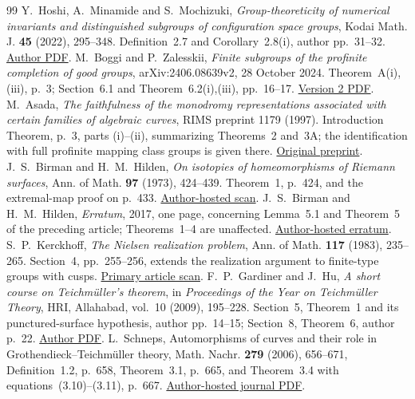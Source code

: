 \documentclass[11pt,a4paper]{article}
\theoremstyle{definition}
\theoremstyle{remark}
\begin{document}
\begin{thebibliography}{99}
 Y.~Hoshi, A.~Minamide and S.~Mochizuki,
\emph{Group-theoreticity of numerical invariants and distinguished
subgroups of configuration space groups}, Kodai Math. J.
\textbf{45} (2022), 295--348. Definition~2.7 and
Corollary~2.8(i), author pp.~31--32.
\href{https://www.kurims.kyoto-u.ac.jp/~motizuki/Numerical\%20invariants\%20and\%20distinguished\%20subgroups\%20of\%20configuration\%20spaces.pdf}{Author PDF}.
 M.~Boggi and P.~Zalesskii,
\emph{Finite subgroups of the profinite completion of good groups},
arXiv:2406.08639v2, 28 October 2024. Theorem~A(i),(iii),
p.~3; Section~6.1 and Theorem~6.2(i),(iii), pp.~16--17.
\href{https://arxiv.org/pdf/2406.08639v2}{Version 2 PDF}.
 M.~Asada,
\emph{The faithfulness of the monodromy representations associated
with certain families of algebraic curves}, RIMS preprint 1179
(1997). Introduction Theorem, p.~3, parts (i)--(ii), summarizing
Theorems~2 and~3A; the identification with full profinite
mapping class groups is given there.
\href{https://www.kurims.kyoto-u.ac.jp/preprint/file/RIMS1179.ps.gz}{Original preprint}.
 J.~S.~Birman and H.~M.~Hilden,
\emph{On isotopies of homeomorphisms of Riemann surfaces},
Ann. of Math. \textbf{97} (1973), 424--439.
Theorem~1, p.~424, and the extremal-map proof on p.~433.
\href{https://www.math.columbia.edu/~jb/bir-hilden-annals.pdf}{Author-hosted scan}.
 J.~S.~Birman and H.~M.~Hilden,
\emph{Erratum}, 2017, one page, concerning Lemma~5.1 and
Theorem~5 of the preceding article; Theorems~1--4 are unaffected.
\href{https://www.math.columbia.edu/~jb/bh-erratum.pdf}{Author-hosted erratum}.
 S.~P.~Kerckhoff,
\emph{The Nielsen realization problem}, Ann. of Math.
\textbf{117} (1983), 235--265. Section~4, pp.~255--256,
extends the realization argument to finite-type groups with cusps.
\href{https://people.math.harvard.edu/~ctm/home/text/others/kerckhoff/nielsen/nielsen.pdf}{Primary article scan}.
 F.~P.~Gardiner and J.~Hu,
\emph{A short course on Teichm\"uller's theorem},
in \emph{Proceedings of the Year on Teichm\"uller Theory},
HRI, Allahabad, vol.~10 (2009), 195--228.
Section~5, Theorem~1 and its punctured-surface hypothesis,
author pp.~14--15; Section~8, Theorem~6, author p.~22.
\href{https://userhome.brooklyn.cuny.edu/gardiner/A\%20short\%20course\%20on\%20Teichmuller\%27s\%20theorem.pdf}{Author PDF}.
 L.~Schneps,
Automorphisms of curves and their role in Grothendieck--Teichm\"uller
theory, Math. Nachr. \textbf{279} (2006), 656--671,
Definition~1.2, p.~658, Theorem~3.1, p.~665, and
Theorem~3.4 with equations~(3.10)--(3.11), p.~667.
\href{https://webusers.imj-prg.fr/~leila.schneps/automorphisms.pdf}{Author-hosted journal PDF}.
\end{thebibliography}
\end{document}
